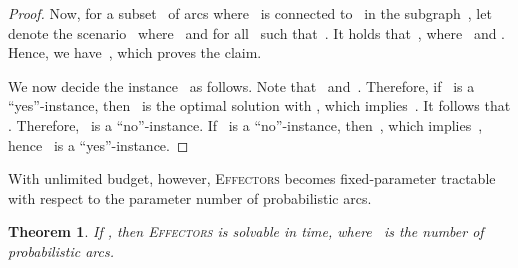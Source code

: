 \documentclass{article}
\newtheorem{theorem}{Theorem}
\newcommand{\probEffectors}{\textsc{Effectors}\xspace}
\begin{document}
\begin{proof}
  Now, for a subset~ of arcs where~ is
  connected to~ in the subgraph~, let~ denote
  the scenario~ where~ and
   for all~ such that~.
  It holds that~, where~ and
  .
  Hence, we have~, which proves the claim.

  We now decide the instance~ as follows.
  Note that~
  and~.
  Therefore, if~ is a ``yes''-instance, then~ is the
  optimal solution with , which implies~.
  It follows that .
  Therefore, ~is a ``no''-instance.
  If~ is a ``no''-instance, then~, which implies~,
  hence~ is a ``yes''-instance.     
\end{proof}

With unlimited budget, however, \probEffectors becomes fixed-parameter
tract\-able with respect to the parameter number  of probabilistic arcs.

\begin{theorem}\label{thm:inftyFPTr}
  If , 
  then \probEffectors is solvable in  time,
  where~ is the number of probabilistic arcs.
\end{theorem}

\newcommand{\Xplus}{X_{o}}
\newcommand{\Xp}{X_p}
\newcommand{\Yplus}{Y_{o}}
\newcommand{\Yp}{Y_p}
\newcommand{\Vplus}{V_{o}}
\newcommand{\Vp}{V_p}
\end{document}
